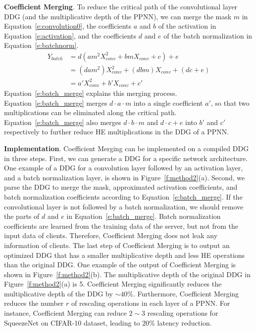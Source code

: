 \documentclass{article}
\begin{document}
\textbf{Coefficient Merging}. To reduce the critical path of the convolutional layer DDG (and the multiplicative depth of the PPNN), we can merge the mask $m$ in Equation~\ref{e:convolution0}, the coefficients $a$ and $b$ of the activation in Equation~\ref{e:activation}, and the coefficients $d$ and $e$ of the batch normalization in Equation~\ref{e:batchnorm}.
\begin{equation}
\label{e:batch_merge}
\begin{split}
	Y_{batch}  &= d(a m^2 X^2_{conv} + b m X_{conv} +c)+e\\
			       &= (d a m^2) X^2_{conv} + (d b m) X_{conv} +(d c +e) \\
			       &= a' X^2_{conv} + b' X_{conv} +c'
\end{split}
\end{equation} 
Equation~\ref{e:batch_merge} explains this merging process. Equation~\ref{e:batch_merge} merges $d\cdot a\cdot m$ into a single coefficient $a'$, so that two multiplications can be eliminated along the critical path. Equation~\ref{e:batch_merge} also merges $d \cdot b\cdot m$ and $d \cdot c +e$ into $b'$ and $c'$ respectively to further reduce HE multiplications in the DDG of a PPNN. 




\textbf{Implementation}. Coefficient Merging can be implemented on a compiled DDG in three steps. First, we can generate a DDG for a specific network architecture. One example of a DDG for a convolution layer followed by an activation layer, and a batch normalization layer, is shown in Figure~\ref{f:method2}(a). Second, we parse the DDG to merge the mask, approximated activation coefficients, and batch normalization coefficients according to Equation~\ref{e:batch_merge}. If the convolutional layer is not followed by a batch normalization, we should remove the parts of $d$ and $e$ in Equation~\ref{e:batch_merge}. Batch normalization coefficients are learned from the training data of the server, but not from the input data of clients. Therefore, Coefficient Merging does not leak any information of clients. The last step of Coefficient Merging is to output an optimized DDG that has a smaller multiplicative depth and less HE operations than the original DDG. One example of the output of Coefficient Merging is shown in Figure~\ref{f:method2}(b). The multiplicative depth of the original DDG in Figure~\ref{f:method2}(a) is 5. Coefficient Merging significantly reduces the multiplicative depth of the DDG by $\sim40\%$. Furthermore, Coefficient Merging reduces the number $r$ of rescaling operations in each layer of a PPNN. For instance, Coefficient Merging can reduce $2\sim 3$ rescaling operations for SqueezeNet on CIFAR-10 dataset, leading to $20\%$ latency reduction. %
\end{document}
